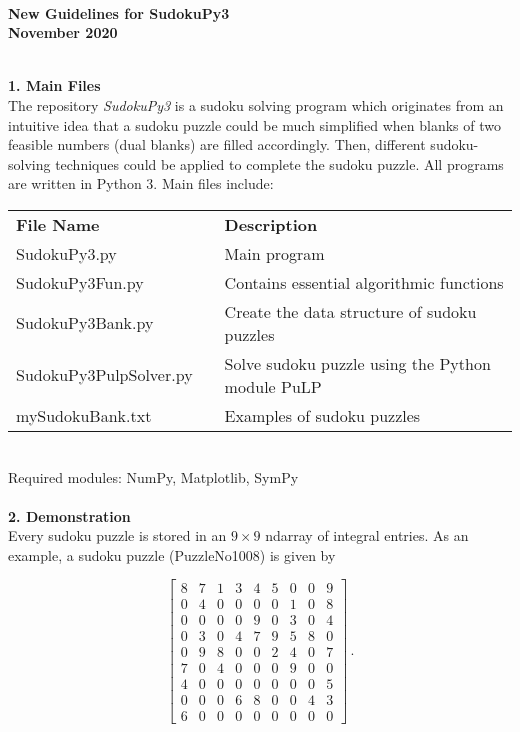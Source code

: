 \documentclass{article}[12pt,a4paper]
\begin{document}

\pagestyle{empty}
\hrulefill \\[2pt]
\begin{center} \bf New Guidelines for SudokuPy3 \\
November 2020 \end{center}

\hrulefill \\[2pt]

{\bf 1. \spa Main Files} \\[4pt]
The repository {\it SudokuPy3} is a sudoku solving program which originates from an intuitive idea 
that a sudoku puzzle could be much simplified when blanks of two feasible numbers (dual blanks) are filled accordingly. 
Then, different sudoku-solving techniques could be applied to complete the sudoku puzzle. 
All programs are written in Python 3. Main files include:  \\[4pt]

\begin{tabular}{lll}
{\bf File Name} & \hspace{0.25in} & {\bf Description} \\[1pt]
SudokuPy3.py && Main program \\[1pt]
SudokuPy3Fun.py && Contains essential algorithmic functions\\[1pt]
SudokuPy3Bank.py && Create the data structure of sudoku puzzles \\[1pt]
SudokuPy3PulpSolver.py && Solve sudoku puzzle using the Python module PuLP \\[1pt]
mySudokuBank.txt && Examples of sudoku puzzles \\
\end{tabular} \\[8pt]

Required modules: \spa NumPy, \spa Matplotlib, \spa SymPy \\

\hrulefill \\[2pt]

{\bf 2. \spa Demonstration} \\[4pt]
Every sudoku puzzle is stored in an $9\times 9$ ndarray of integral entries. As an example, 
a sudoku puzzle (PuzzleNo1008) is given by 

\[ \left [ \begin{array}{ccc|ccc|ccc}
8 & 7 & 1 & 3 & 4 & 5 & 0 & 0 & 9 \\[-0.05in]
0 & 4 & 0 & 0 & 0 & 0 & 1 & 0 & 8 \\[-0.05in]
0 & 0 & 0 & 0 & 9 & 0 & 3 & 0 & 4 \\[-0.05in] \hline
0 & 3 & 0 & 4 & 7 & 9 & 5 & 8 & 0 \\[-0.05in]
0 & 9 & 8 & 0 & 0 & 2 & 4 & 0 & 7 \\[-0.05in]
7 & 0 & 4 & 0 & 0 & 0 & 9 & 0 & 0 \\[-0.05in] \hline
4 & 0 & 0 & 0 & 0 & 0 & 0 & 0 & 5 \\[-0.05in]
0 & 0 & 0 & 6 & 8 & 0 & 0 & 4 & 3 \\[-0.05in]
6 & 0 & 0 & 0 & 0 & 0 & 0 & 0 & 0 
\end{array} \right] \, .\]
\vspace*{4pt}
\end{document}
